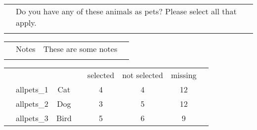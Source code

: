 \documentclass{article}
\begin{document}
{\begin{table}
\begin{tabularx}{\textwidth}{lX}
  & Do you have any of these animals as pets? Please select all that apply. \\
  \\
\end{tabularx}

\begin{tabularx}{\textwidth}{lllr}
 & Notes &  These are some notes &  \\
 & & & &
\end{tabularx}

\begin{tabularx}{\textwidth}{llcXcccr}
 &            &      &         & selected & not selected  & missing \\
 & allpets\_1 & Cat  & \dotfill & 4 & 4 & 12 & \\
 & allpets\_2 & Dog  & \dotfill & 3 & 5 & 12 & \\
 & allpets\_3 & Bird & \dotfill & 5 & 6 & 9 & \\
\end{tabularx}
\end{table}
}
\end{document}
